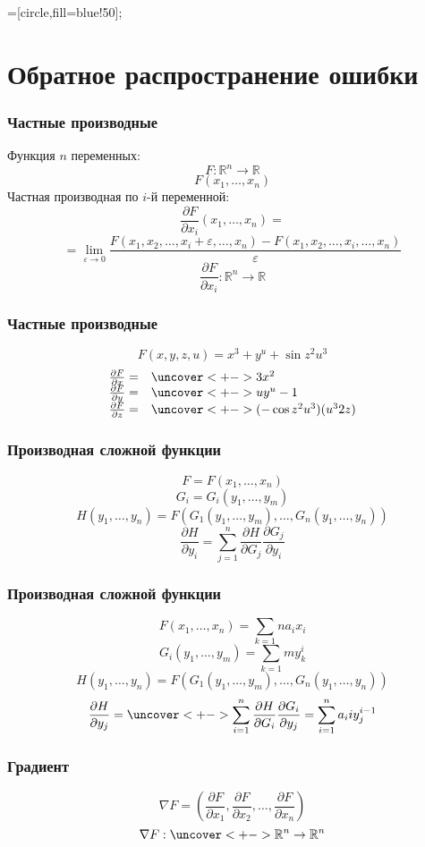 \documentclass[24pt,pdf,hyperref={unicode}]{beamer}
\newcommand{\dd}[2]{\frac{\partial #1}{\partial #2}}
\begin{document}
=[circle,fill=blue!50];



\section{Обратное распространение ошибки}


\begin{frame}\frametitle{Частные производные}
Функция $n$ переменных:
$$
F:\mathbb{R}^n\rightarrow\mathbb{R} 
$$
$$
F(x_1,\ldots,x_n)
$$
Частная производная по $i$-й переменной:
$$
\dd{F}{x_i}(x_1,\ldots,x_n)=
$$
$$
=\lim_{\varepsilon\rightarrow 0}\frac{F(x_1,x_2,\ldots,x_i+\varepsilon,\ldots,x_n)-F(x_1,x_2,\ldots,x_i,\ldots,x_n)}{\varepsilon}
$$
$$
\dd{F}{x_i}:\mathbb{R}^n\rightarrow\mathbb{R}
$$

\end{frame}

\begin{frame}\frametitle{Частные производные}
\uncover<+->{}
$$
F(x,y,z,u)=x^3+y^u+\sin z^2u^3
$$
$$
\begin{array}{l l}
\dd{F}{x} = & \uncover<+->{3x^2} \\
\dd{F}{y}= & \uncover<+->{uy^u-1} \\
\dd{F}{z}= & \uncover<+->{(-\cos z^2u^3)(u^32z)}
\end{array}
$$
\end{frame}

\begin{frame}\frametitle{Производная сложной функции}
$$
F=F(x_1,\ldots,x_n)
$$
$$
G_i=G_i(y_1,\ldots,y_m)
$$
$$
H(y_1,\ldots,y_n)=F(G_1(y_1,\ldots,y_m),\ldots, G_n(y_1,\ldots,y_n))
$$
$$
\dd{H}{y_i}=\sum_{j=1}^{n}\dd{H}{G_j}\dd{G_j}{y_i}
$$
\end{frame}

\begin{frame}\frametitle{Производная сложной функции}
\uncover<+->{}
$$
F(x_1,\ldots,x_n)=\sum_{k=1}{n} a_ix_i
$$
$$
G_i(y_1,\ldots,y_m)=\sum_{k=1}{m}y_k^i
$$
$$
H(y_1,\ldots,y_n)=F(G_1(y_1,\ldots,y_m),\ldots, G_n(y_1,\ldots,y_n))
$$
\uncover<+->{
$$
\dd{F}{G_i}=a_i,\ \dd{G_i}{y_j}=iy_j^{i-1}
$$
}
$$
\dd{H}{y_j}=\uncover<+->{\sum_{i=1}^{n}\dd{H}{G_i}\dd{G_i}{y_j}=\sum_{i=1}^{n} a_iiy_j^{i-1}}
$$

\end{frame}

\begin{frame}\frametitle{Градиент}
\uncover<+->{}
$$
\nabla F = \left(\dd{F}{x_1},\dd{F}{x_2},\ldots,\dd{F}{x_n}\right)
$$
$$
\nabla F : \uncover<+->{\mathbb{R}^n\rightarrow\mathbb{R}^n}
$$
\end{frame}
\end{document}

